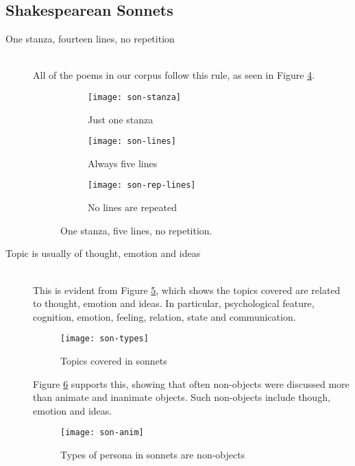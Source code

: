 \subsection{Shakespearean Sonnets}

\begin{description}
\item[One stanza, fourteen lines, no repetition]  \hfill \\
All of the poems in our corpus follow this rule, as seen in Figure \ref{fig:son1}.

\begin{figure}[H]
\centering
\begin{subfigure}[t]{0.3\textwidth}
	\centering
    \texttt{[image: son-stanza]}
    \caption{Just one stanza}
    \label{fig:son-stanza}
\end{subfigure}
\begin{subfigure}[t]{0.3\textwidth}
	\centering
    \texttt{[image: son-lines]}
    \caption{Always five lines}
    \label{fig:son-lines}
\end{subfigure}
\begin{subfigure}[t]{0.3\textwidth}
	\centering
    \texttt{[image: son-rep-lines]}
    \caption{No lines are repeated}
    \label{fig:son-rep-lines}
\end{subfigure}
\caption{One stanza, five lines, no repetition.}
\label{fig:son1}
\end{figure}

\item[Topic is usually of thought, emotion and ideas]  \hfill \\
This is evident from Figure \ref{fig:son-types}, which shows the topics covered are related to thought, emotion and ideas. In particular, psychological feature, cognition, emotion, feeling, relation, state and communication.

\begin{figure}[H]
\centering
\texttt{[image: son-types]}
\caption{Topics covered in sonnets}
\label{fig:son-types}
\end{figure}

Figure \ref{fig:son-anim} supports this, showing that often non-objects were discussed more than animate and inanimate objects. Such non-objects include though, emotion and ideas.

\begin{figure}[H]
\centering
\texttt{[image: son-anim]}
\caption{Types of persona in sonnets are non-objects}
\label{fig:son-anim}
\end{figure}


\end{description}
